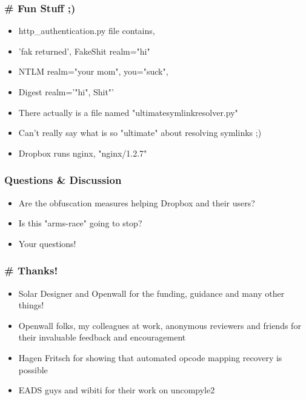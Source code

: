 \documentclass{beamer}
\newcommand\myfont{\fontsize{14}{20}\selectfont}
\begin{document}
\begin{frame}
\frametitle{\# Fun Stuff ;)}
\begin{itemize}
\itemsep 1em
\item http\_authentication.py file contains,
\item 'fak returned', FakeShit realm="hi"
\item NTLM realm="your mom", you="suck",
\item Digest realm='"hi", Shit"'
\item There actually is a file named "ultimatesymlinkresolver.py"
\item Can't really say what is so "ultimate" about resolving symlinks ;)
\item Dropbox runs nginx, "nginx/1.2.7"
\end{itemize}
\end{frame}

\begin{frame}
\frametitle{Questions \& Discussion}
\myfont
\begin{itemize}
\itemsep 2em
\item Are the obfuscation measures helping Dropbox and their users?
\item Is this "arms-race" going to stop?
\item Your questions!
\end{itemize}
\end{frame}

\begin{frame}
\frametitle{\# Thanks!}
\begin{itemize}
\itemsep 2em
\item Solar Designer and Openwall for the funding, guidance and many other things!
\item Openwall folks, my colleagues at work, anonymous reviewers and friends
for their invaluable feedback and encouragement
\item Hagen Fritsch for showing that automated opcode mapping recovery is
possible
\item EADS guys and wibiti for their work on uncompyle2
\end{itemize}
\end{frame}
\end{document}
